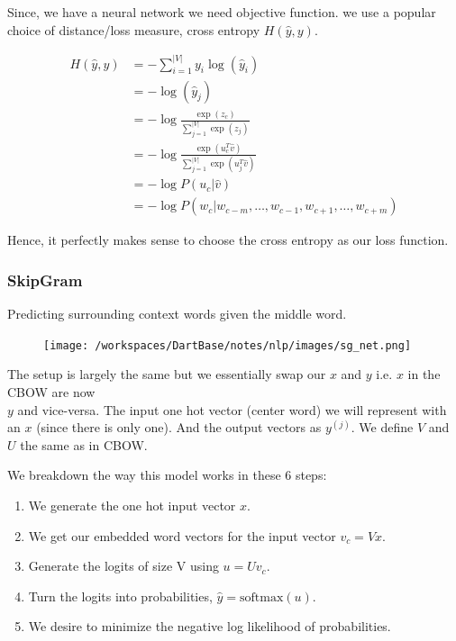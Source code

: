\documentclass[12pt]{article}
\begin{document}
            Since, we have a neural network we need objective function.
            we use a popular choice of distance/loss
            measure, cross entropy $H(\hat{y}, y)$.

            \begin{align*}
                H(\hat{y}, y) &= -\sum_{i=1}^{|V|} y_i \log(\hat{y}_i) \\
                &= -\log(\hat{y}_j)\\
                &= - \log \frac{\exp(z_c)}{\sum_{j=1}^{|V|} \exp(z_j)} \\
                &= - \log \frac{\exp(u_c^T \hat{v})}{\sum_{j=1}^{|V|} \exp(u_j^T \hat{v})} \\
                &= - \log P(u_c|\hat{v}) \\
                &= - \log P(w_c|w_{c-m}, \ldots, w_{c-1}, w_{c+1}, \ldots, w_{c+m})
            \end{align*}
            
            Hence, it perfectly makes sense to choose the cross entropy as our loss function.
        
        \subsubsection{SkipGram}
            Predicting surrounding context words given the middle word.\\
            \begin{figure}[h]
                \centering
                \texttt{[image: /workspaces/DartBase/notes/nlp/images/sg\_net.png]}
            \end{figure}
            
            The setup is largely the same but we essentially swap our $x$ and $y$ i.e. $x$ in the CBOW are now \\ $y$ and vice-versa. 
            The input one hot vector (center word) we will represent with an $x$ (since there is only one). 
            And the output vectors as $y^{(j)}$. We define $V$ and $U$ the same as in CBOW.


            We breakdown the way this model works in these 6 steps:
            \begin{enumerate}
                \item We generate the one hot input vector $x$.
                \item We get our embedded word vectors for the input vector $v_c = Vx$.
                \item Generate the logits of size V using $u = Uv_c$.
                \item Turn the logits into probabilities, $\hat{y} = \text{softmax}(u)$.
                \item We desire to minimize the negative log likelihood of probabilities.
            \end{enumerate}
            
\end{document}
